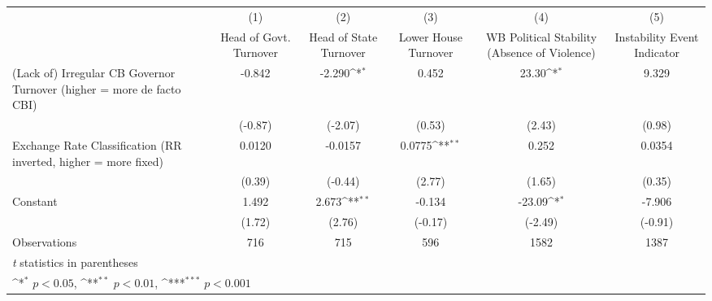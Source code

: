 {
\def\sym#1{\ifmmode^{#1}\else\(^{#1}\)\fi}
\begin{tabular*}{\linewidth}{@{\hskip\tabcolsep\extracolsep\fill}l*{5}{c}}
\hline\hline
                &\multicolumn{1}{c}{(1)}&\multicolumn{1}{c}{(2)}&\multicolumn{1}{c}{(3)}&\multicolumn{1}{c}{(4)}&\multicolumn{1}{c}{(5)}\\
                &\multicolumn{1}{c}{Head of Govt. Turnover}&\multicolumn{1}{c}{Head of State Turnover}&\multicolumn{1}{c}{Lower House Turnover}&\multicolumn{1}{c}{WB Political Stability (Absence of Violence)}&\multicolumn{1}{c}{Instability Event Indicator}\\
\hline
(Lack of) Irregular CB Governor Turnover (higher = more de facto CBI)&   -0.842         &   -2.290\sym{*}  &    0.452         &    23.30\sym{*}  &    9.329         \\
                &  (-0.87)         &  (-2.07)         &   (0.53)         &   (2.43)         &   (0.98)         \\
[1em]
Exchange Rate Classification (RR inverted, higher = more fixed)&   0.0120         &  -0.0157         &   0.0775\sym{**} &    0.252         &   0.0354         \\
                &   (0.39)         &  (-0.44)         &   (2.77)         &   (1.65)         &   (0.35)         \\
[1em]
Constant        &    1.492         &    2.673\sym{**} &   -0.134         &   -23.09\sym{*}  &   -7.906         \\
                &   (1.72)         &   (2.76)         &  (-0.17)         &  (-2.49)         &  (-0.91)         \\
\hline
Observations    &      716         &      715         &      596         &     1582         &     1387         \\
\hline\hline
\multicolumn{6}{l}{\footnotesize \textit{t} statistics in parentheses}\\
\multicolumn{6}{l}{\footnotesize \sym{*} \(p<0.05\), \sym{**} \(p<0.01\), \sym{***} \(p<0.001\)}\\
\end{tabular*}
}
